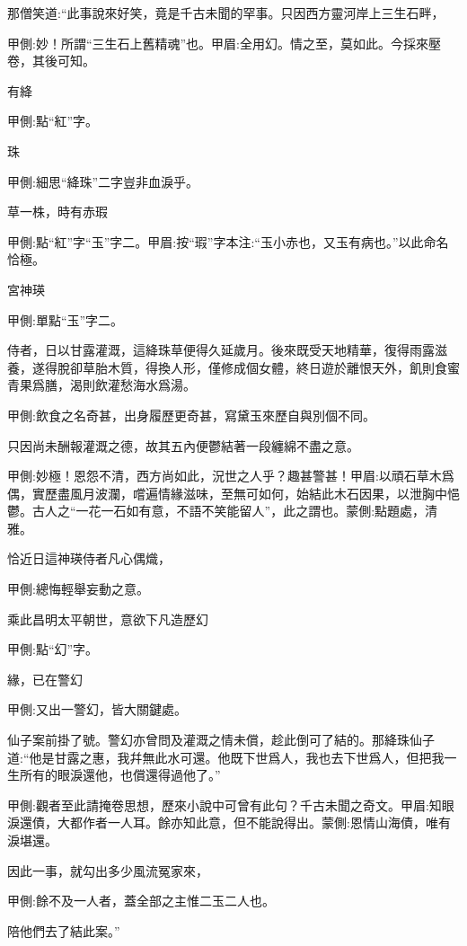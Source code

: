 \begin{parag}
    那僧笑道:“此事說來好笑，竟是千古未聞的罕事。只因西方靈河岸上三生石畔，\begin{note}甲側:妙！所謂“三生石上舊精魂”也。甲眉:全用幻。情之至，莫如此。今採來壓卷，其後可知。\end{note}有絳\begin{note}甲側:點“紅”字。\end{note}珠\begin{note}甲側:細思“絳珠”二字豈非血淚乎。\end{note}草一株，時有赤瑕\begin{note}甲側:點“紅”字“玉”字二。甲眉:按“瑕”字本注:“玉小赤也，又玉有病也。”以此命名恰極。\end{note}宮神瑛\begin{note}甲側:單點“玉”字二。\end{note}侍者，日以甘露灌溉，這絳珠草便得久延歲月。後來既受天地精華，復得雨露滋養，遂得脫卻草胎木質，得換人形，僅修成個女體，終日遊於離恨天外，飢則食蜜青果爲膳，渴則飲灌愁海水爲湯。\begin{note}甲側:飲食之名奇甚，出身履歷更奇甚，寫黛玉來歷自與別個不同。\end{note}只因尚未酬報灌溉之德，故其五內便鬱結著一段纏綿不盡之意。\begin{note}甲側:妙極！恩怨不清，西方尚如此，況世之人乎？趣甚警甚！甲眉:以頑石草木爲偶，實歷盡風月波瀾，嚐遍情緣滋味，至無可如何，始結此木石因果，以泄胸中悒鬱。古人之“一花一石如有意，不語不笑能留人”，此之謂也。蒙側:點題處，清雅。\end{note}恰近日這神瑛侍者凡心偶熾，\begin{note}甲側:總悔輕舉妄動之意。\end{note}乘此昌明太平朝世，意欲下凡造歷幻\begin{note}甲側:點“幻”字。\end{note}緣，已在警幻\begin{note}甲側:又出一警幻，皆大關鍵處。\end{note}仙子案前掛了號。警幻亦曾問及灌溉之情未償，趁此倒可了結的。那絳珠仙子道:“他是甘露之惠，我幷無此水可還。他既下世爲人，我也去下世爲人，但把我一生所有的眼淚還他，也償還得過他了。”\begin{note}甲側:觀者至此請掩卷思想，歷來小說中可曾有此句？千古未聞之奇文。甲眉:知眼淚還債，大都作者一人耳。餘亦知此意，但不能說得出。蒙側:恩情山海債，唯有淚堪還。\end{note}因此一事，就勾出多少風流冤家來，\begin{note}甲側:餘不及一人者，蓋全部之主惟二玉二人也。\end{note}陪他們去了結此案。”
\end{parag}


